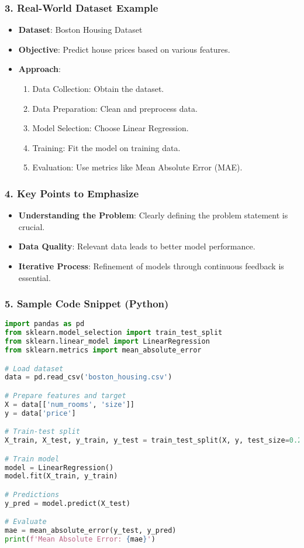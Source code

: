 \documentclass{beamer}
\begin{document}
\begin{frame}[fragile]
    \frametitle{3. Real-World Dataset Example}
    \begin{itemize}
        \item \textbf{Dataset}: Boston Housing Dataset
        \item \textbf{Objective}: Predict house prices based on various features.
        \item \textbf{Approach}:
        \begin{enumerate}
            \item Data Collection: Obtain the dataset.
            \item Data Preparation: Clean and preprocess data.
            \item Model Selection: Choose Linear Regression.
            \item Training: Fit the model on training data.
            \item Evaluation: Use metrics like Mean Absolute Error (MAE).
        \end{enumerate}
    \end{itemize}
\end{frame}

\begin{frame}[fragile]
    \frametitle{4. Key Points to Emphasize}
    \begin{itemize}
        \item \textbf{Understanding the Problem}: Clearly defining the problem statement is crucial.
        \item \textbf{Data Quality}: Relevant data leads to better model performance.
        \item \textbf{Iterative Process}: Refinement of models through continuous feedback is essential.
    \end{itemize}
\end{frame}

\begin{frame}[fragile]
    \frametitle{5. Sample Code Snippet (Python)}
    \begin{lstlisting}[language=Python]
import pandas as pd
from sklearn.model_selection import train_test_split
from sklearn.linear_model import LinearRegression
from sklearn.metrics import mean_absolute_error

# Load dataset
data = pd.read_csv('boston_housing.csv')

# Prepare features and target
X = data[['num_rooms', 'size']]
y = data['price']

# Train-test split
X_train, X_test, y_train, y_test = train_test_split(X, y, test_size=0.2, random_state=42)

# Train model
model = LinearRegression()
model.fit(X_train, y_train)

# Predictions
y_pred = model.predict(X_test)

# Evaluate
mae = mean_absolute_error(y_test, y_pred)
print(f'Mean Absolute Error: {mae}')
    \end{lstlisting}
\end{frame}
\end{document}
